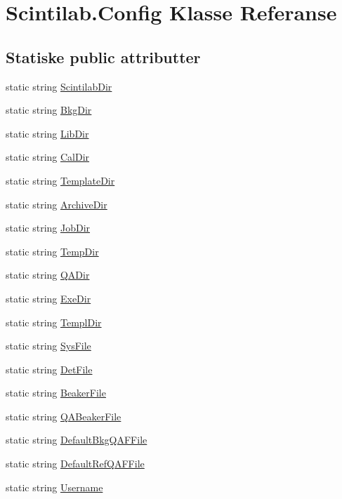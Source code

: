 \hypertarget{class_scintilab_1_1_config}{\section{Scintilab.\+Config Klasse Referanse}
\label{class_scintilab_1_1_config}
}
\subsection*{Statiske public attributter}
\begin{DoxyCompactItemize}
\item 
static string \hyperlink{class_scintilab_1_1_config_a64f1560197ddefe3f0e43bd620dd72c8}{Scintilab\+Dir}
\item 
static string \hyperlink{class_scintilab_1_1_config_afdad0bcf0906fdd0e7f34b3400fa8809}{Bkg\+Dir}
\item 
static string \hyperlink{class_scintilab_1_1_config_a7254f3412dd5234d0691262a8b898fd7}{Lib\+Dir}
\item 
static string \hyperlink{class_scintilab_1_1_config_a8bb782f1eebd5ba14d686c57bc981298}{Cal\+Dir}
\item 
static string \hyperlink{class_scintilab_1_1_config_a281e06e21224c52ea875ca48a91285ac}{Template\+Dir}
\item 
static string \hyperlink{class_scintilab_1_1_config_a772b5a6dcac628889128d1a896b36658}{Archive\+Dir}
\item 
static string \hyperlink{class_scintilab_1_1_config_a0810c3c214672429b456af8f77e98632}{Job\+Dir}
\item 
static string \hyperlink{class_scintilab_1_1_config_a2cd246ee28cb2fbf3b3664e2de4e4a2f}{Temp\+Dir}
\item 
static string \hyperlink{class_scintilab_1_1_config_ae7e1416a22380f4b5825e0ab9e49ee43}{Q\+A\+Dir}
\item 
static string \hyperlink{class_scintilab_1_1_config_a1df46889d2f1072cbfcd82e85117b55f}{Exe\+Dir}
\item 
static string \hyperlink{class_scintilab_1_1_config_ac4f5562af1d1a600b566d6c8b8e51d35}{Templ\+Dir}
\item 
static string \hyperlink{class_scintilab_1_1_config_a08bd32b13d26a35e5888aa530b757fd8}{Sys\+File}
\item 
static string \hyperlink{class_scintilab_1_1_config_aceb97f9538b41c0176f8408f81cc07ef}{Det\+File}
\item 
static string \hyperlink{class_scintilab_1_1_config_a1a1585ef6037b90a42a2fd1b2bac9b9d}{Beaker\+File}
\item 
static string \hyperlink{class_scintilab_1_1_config_a732e164c0f203b6dfccd10dd3081289d}{Q\+A\+Beaker\+File}
\item 
static string \hyperlink{class_scintilab_1_1_config_a022e7110df1c42b1bfcfb167400a2dbf}{Default\+Bkg\+Q\+A\+F\+File}
\item 
static string \hyperlink{class_scintilab_1_1_config_a9650ecffaee93e2d86f2c635f963b6fb}{Default\+Ref\+Q\+A\+F\+File}
\item 
static string \hyperlink{class_scintilab_1_1_config_a46bec74f1139be16639b257d38580f22}{Username}
\end{DoxyCompactItemize}


